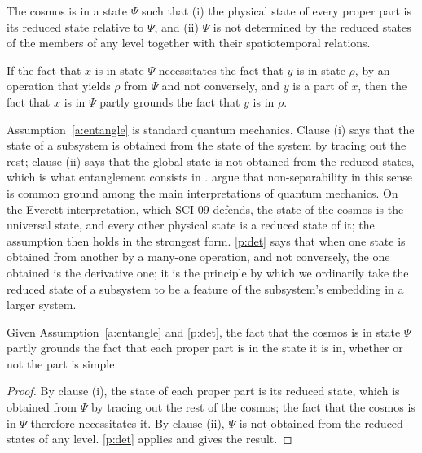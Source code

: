 \documentclass{situationist-preprint}
\begin{document}
\begin{assumption}\label{a:entangle}
The cosmos is in a state $\Psi$ such that (i) the physical state of every proper part is its reduced state relative to $\Psi$, and (ii) $\Psi$ is not determined by the reduced states of the members of any level together with their spatiotemporal relations.
\end{assumption}

\begin{principle}[Determination]\label{p:det}
If the fact that $x$ is in state $\Psi$ necessitates the fact that $y$ is in state $\rho$, by an operation that yields $\rho$ from $\Psi$ and not conversely, and $y$ is a part of $x$, then the fact that $x$ is in $\Psi$ partly grounds the fact that $y$ is in $\rho$.
\end{principle}

Assumption~\ref{a:entangle} is standard quantum mechanics. Clause (i) says that the state of a subsystem is obtained from the state of the system by tracing out the rest; clause (ii) says that the global state is not obtained from the reduced states, which is what entanglement consists in \citep{Teller1986,Healey1991}. \citet{IsmaelSchaffer2020} argue that non-separability in this sense is common ground among the main interpretations of quantum mechanics. On the Everett interpretation, which SCI-09 defends, the state of the cosmos is the universal state, and every other physical state is a reduced state of it; the assumption then holds in the strongest form. \ref{p:det} says that when one state is obtained from another by a many-one operation, and not conversely, the one obtained is the derivative one; it is the principle by which we ordinarily take the reduced state of a subsystem to be a feature of the subsystem's embedding in a larger system.

\begin{proposition}\label{p:natures}
Given Assumption~\ref{a:entangle} and \ref{p:det}, the fact that the cosmos is in state $\Psi$ partly grounds the fact that each proper part is in the state it is in, whether or not the part is simple.
\end{proposition}

\begin{proof}
By clause (i), the state of each proper part is its reduced state, which is obtained from $\Psi$ by tracing out the rest of the cosmos; the fact that the cosmos is in $\Psi$ therefore necessitates it. By clause (ii), $\Psi$ is not obtained from the reduced states of any level. \ref{p:det} applies and gives the result.
\end{proof}
\end{document}
